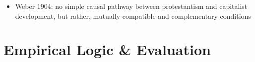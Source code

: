 \documentclass[12pt]{article}
\begin{document}
\begin{itemize}
\begin{itemize}
\begin{itemize}
            \item Putnam 1993: social capital drives democratic development -- this development leads to better economic development, but social capital itself may be stronger in settings where economic wellbeing is present or improving
        \end{itemize}
        \item Neither
        \begin{itemize}
            \item Huntington 1968: political development does not inherently occur when economic development occurs; rather, it must be imposed or risk significant instability. (That being said, this development can be an influence on the decision to impose such institutions.)
            \item Przeworski et al 2000: democracies are less likely to survive stagnant economies, so the democracies we observe tend to be economically developed as a survivorship effect rather than a true causal effect
        \end{itemize}
    \end{itemize}
    \item Weber 1904: no simple causal pathway between protestantism and capitalist development, but rather, mutually-compatible and complementary conditions
\end{itemize}





\section*{Empirical Logic \& Evaluation}
\end{document}
